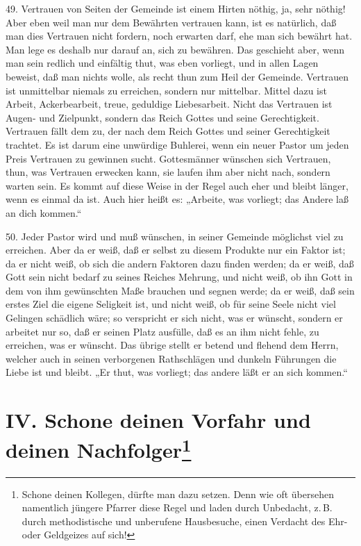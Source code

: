 49. Vertrauen von Seiten der Gemeinde ist einem
Hirten nöthig, ja, sehr nöthig! Aber eben weil man nur dem Bewährten vertrauen kann, ist es natürlich, daß man dies Vertrauen nicht fordern, noch erwarten darf, ehe man sich bewährt hat. Man lege es deshalb nur darauf an, sich zu bewähren. Das geschieht aber, wenn man sein redlich und einfältig thut, was eben vorliegt, und in allen Lagen beweist, daß man nichts wolle, als recht thun zum Heil der Gemeinde. Vertrauen ist unmittelbar niemals zu erreichen, sondern nur mittelbar. Mittel dazu ist Arbeit, Ackerbearbeit, treue, geduldige Liebesarbeit. Nicht das Vertrauen ist Augen- und Zielpunkt, sondern das Reich Gottes und seine Gerechtigkeit. Vertrauen fällt dem zu, der nach dem Reich Gottes und seiner Gerechtigkeit trachtet. Es ist darum eine unwürdige Buhlerei, wenn ein neuer Pastor um jeden Preis Vertrauen zu gewinnen sucht. Gottesmänner wünschen sich Vertrauen, thun, was Vertrauen erwecken kann, sie laufen ihm aber nicht nach, sondern warten sein. Es kommt auf diese Weise in der Regel auch eher und bleibt länger, wenn es einmal da ist. Auch hier heißt es: „Arbeite, was vorliegt; das Andere laß an dich kommen.“

50. Jeder Pastor wird und muß wünschen, in seiner Gemeinde möglichst viel zu erreichen. Aber da er weiß, daß er selbst zu diesem Produkte nur ein Faktor ist; da er nicht weiß, ob sich die andern Faktoren dazu finden werden; da er weiß, daß Gott sein nicht bedarf zu seines Reiches Mehrung, und nicht weiß, ob ihn Gott in dem von ihm gewünschten Maße brauchen und segnen werde; da er weiß, daß sein erstes Ziel die eigene Seligkeit ist, und nicht weiß, ob für seine Seele nicht viel Gelingen
schädlich wäre; so verspricht er sich nicht, was er wünscht, sondern er arbeitet nur so, daß er seinen Platz ausfülle, daß es an ihm nicht fehle, zu erreichen, was er wünscht. Das übrige stellt er betend und flehend dem Herrn, welcher auch in seinen verborgenen Rathschlägen und dunkeln Führungen die Liebe ist und bleibt. „Er thut, was vorliegt; das andere läßt er an sich kommen.“

\section[IV. Schone deinen Vorfahr und deinen Nachfolger]{IV. Schone deinen Vorfahr und deinen Nachfolger\footnote{Schone deinen Kollegen, dürfte man dazu setzen. Denn wie oft übersehen namentlich jüngere Pfarrer diese Regel und laden durch Unbedacht, z.\,B. durch methodistische und unberufene Hausbesuche, einen Verdacht des Ehr- oder Geldgeizes auf sich!}}

